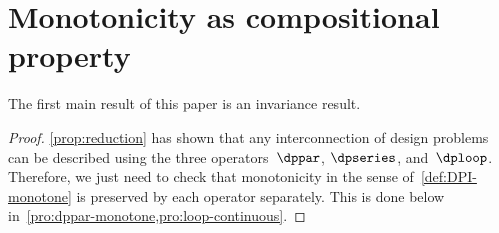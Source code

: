 

\section{Monotonicity as compositional property}

The first main result of this paper is an invariance result.

\noindent
{}

\begin{proof}
  \cref{prop:reduction} has shown that any interconnection of design
  problems can be described using the three operators~$\dppar$, $\dpseries$,
  and~$\dploop$. Therefore, we just need to check that monotonicity
  in the sense of~\cref{def:DPI-monotone} is preserved by each operator
  separately. This is done below in~\cref{pro:dppar-monotone,pro:loop-continuous}.
\end{proof}

